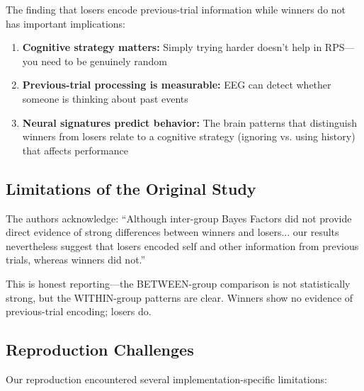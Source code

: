\documentclass[11pt,a4paper]{article}
\begin{document}
The finding that losers encode previous-trial information while winners do not has important implications:

\begin{enumerate}
    \item \textbf{Cognitive strategy matters:} Simply trying harder doesn't help in RPS---you need to be genuinely random
    \item \textbf{Previous-trial processing is measurable:} EEG can detect whether someone is thinking about past events
    \item \textbf{Neural signatures predict behavior:} The brain patterns that distinguish winners from losers relate to a cognitive strategy (ignoring vs. using history) that affects performance
\end{enumerate}

\subsection{Limitations of the Original Study}
\label{subsec:limitations}

The authors acknowledge: ``Although inter-group Bayes Factors did not provide direct evidence of strong differences between winners and losers... our results nevertheless suggest that losers encoded self and other information from previous trials, whereas winners did not.''

This is honest reporting---the BETWEEN-group comparison is not statistically strong, but the WITHIN-group patterns are clear. Winners show no evidence of previous-trial encoding; losers do.

\subsection{Reproduction Challenges}
\label{subsec:reproduction_challenges}

Our reproduction encountered several implementation-specific limitations:
\end{document}
